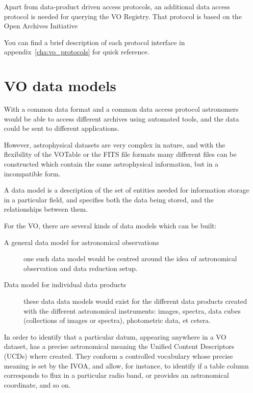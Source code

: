 		 Apart from data-product driven access protocols, an
		additional data access protocol is needed for querying the
		VO Registry. That protocol is based on the Open Archives
		Initiative
		
		 You can find a brief description of each protocol
		interface in appendix~\ref{cha:vo_protocols} for quick
		reference.
		

	\section{VO data models} %
	\label{sec:vo_data_models}
		
		With a common data format and a common data access protocol
		astronomers would be able to access different archives
		using automated tools, and the data could be sent to
		different applications.
		
		 However, astrophysical datasets are very complex in
		nature, and with the flexibility of the VOTable or the FITS
		file formats many different files can be constructed which
		contain the same astrophysical information, but in a
		incompatible form.
		
		 A data model is a description of the set of entities
		needed for information storage in a particular field, and
		specifies both the data being stored, and the relationships
		between them.
		
		 For the VO, there are several kinds of data models which
		can be built:
		
		\begin{description}
			\item[A general data model for astronomical
			observations] one such data model would be centred around
			the idea of astronomical observation and data reduction
			setup.
			
			 \item[Data model for individual data products] these
			data data models would exist for the different data
			products created with the different astronomical
			instruments: images, spectra, data cubes (collections
			of images or spectra), photometric data, et cetera.
		\end{description}
		
		In order to identify that a particular datum, appearing
		anywhere in a VO dataset, has a precise astronomical
		meaning the Unified Content Descriptors (UCDs) where
		created. They conform a controlled vocabulary whose precise
		meaning is set by the IVOA, and allow, for instance, to
		identify if a table column corresponds to flux in a
		particular radio band, or provides an astronomical
		coordinate, and so on.
		
